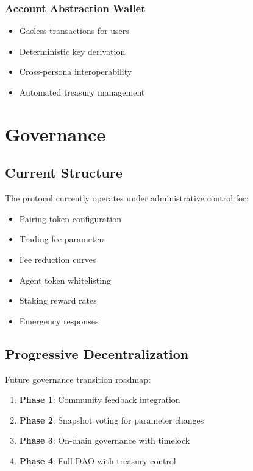 \documentclass{article}
\begin{document}
\subsubsection{Account Abstraction Wallet}
\begin{itemize}
    \item Gasless transactions for users
    \item Deterministic key derivation
    \item Cross-persona interoperability
    \item Automated treasury management
\end{itemize}

\section{Governance}

\subsection{Current Structure}

The protocol currently operates under administrative control for:
\begin{itemize}
    \item Pairing token configuration
    \item Trading fee parameters
    \item Fee reduction curves
    \item Agent token whitelisting
    \item Staking reward rates
    \item Emergency responses
\end{itemize}

\subsection{Progressive Decentralization}

Future governance transition roadmap:

\begin{enumerate}
    \item \textbf{Phase 1}: Community feedback integration
    \item \textbf{Phase 2}: Snapshot voting for parameter changes
    \item \textbf{Phase 3}: On-chain governance with timelock
    \item \textbf{Phase 4}: Full DAO with treasury control
\end{enumerate}
\end{document}
